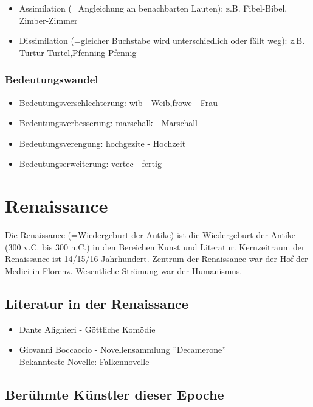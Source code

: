 \documentclass[12pt,a4paper]{article}
\begin{document}
\begin{itemize}
\item Assimilation (=Angleichung an benachbarten Lauten): z.B. Fibel-Bibel, Zimber-Zimmer
\item Dissimilation (=gleicher Buchstabe wird unterschiedlich oder fällt weg): z.B. Turtur-Turtel,Pfenning-Pfennig
\end{itemize}
	
\subsubsection{Bedeutungswandel}
	
\begin{itemize}
\item Bedeutungsverschlechterung: wib - Weib,frowe - Frau
\item Bedeutungsverbesserung: marschalk - Marschall
\item Bedeutungsverengung: hochgezite - Hochzeit
\item Bedeutungserweiterung: vertec - fertig

\end{itemize}

\newpage

\section{Renaissance}

Die Renaissance (=Wiedergeburt der Antike) ist die Wiedergeburt der Antike (300 v.C. bis 300 n.C.) in den Bereichen
Kunst und Literatur. Kernzeitraum der Renaissance ist 14/15/16 Jahrhundert. Zentrum der Renaissance war der Hof der
Medici in Florenz. Wesentliche Strömung war der Humanismus.

\subsection{Literatur in der Renaissance}

\begin{itemize}
\item Dante Alighieri - Göttliche Komödie
\item Giovanni Boccaccio - Novellensammlung ''Decamerone''\\
 Bekannteste Novelle: Falkennovelle 
\end{itemize}

\subsection{Berühmte Künstler dieser Epoche}
\end{document}
